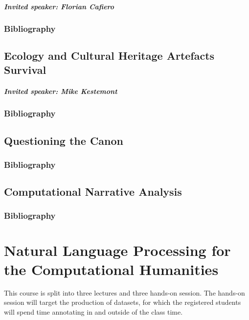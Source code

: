 \documentclass{report}
\begin{document}
\paragraph{Invited speaker: Florian Cafiero}

\subsection*{Bibliography}

\section{Ecology and Cultural Heritage Artefacts Survival}

\paragraph{Invited speaker: Mike Kestemont}

\subsection*{Bibliography}

\section{Questioning the Canon}

\subsection*{Bibliography}

\section{Computational Narrative Analysis}

\subsection*{Bibliography}

\cite{haussler2023operationalizing}

\chapter{Natural Language Processing for the Computational Humanities}

This course is split into three lectures and three hands-on session. The hands-on session will target the production of datasets, for which the registered students will spend time annotating in and outside of the class time.
\end{document}
